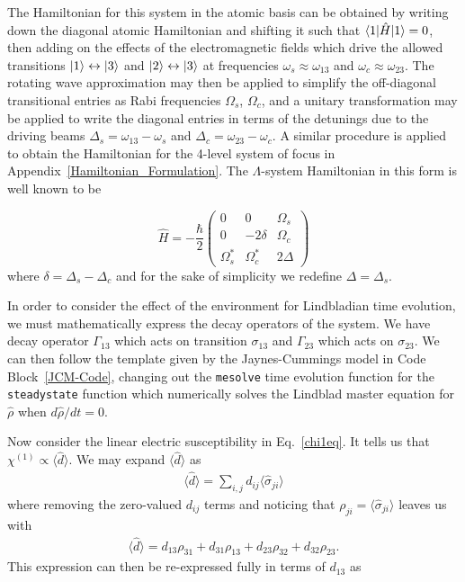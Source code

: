 \documentclass[aps,pra,showpacs,amsmath,amssymb,nofootinbib,longbibliography,superscriptaddress
]{revtex4-1}
\DeclarePairedDelimiter\bra{\langle}{\rvert}
\DeclarePairedDelimiter\ket{\lvert}{\rangle}
\theoremstyle{definition}
\theoremstyle{remark}
\newcommand{\0}{\hat{0}}
\newcommand{\expect}[1]{\bigl\langle #1 \bigr\rangle}
\begin{document}
The Hamiltonian for this system in the atomic basis can be obtained by writing down the diagonal atomic Hamiltonian and shifting it such that $\bra{1} \hat{H} \ket{1} = 0$, then adding on the effects of the electromagnetic fields which drive the allowed transitions $\ket{1} \leftrightarrow \ket{3}$ and $\ket{2} \leftrightarrow \ket{3}$ at frequencies $\omega_s \approx \omega_{13}$ and $\omega_c \approx \omega_{23}$. The rotating wave approximation may then be applied to simplify the off-diagonal transitional entries as Rabi frequencies $\Omega_s$, $\Omega_c$, and a unitary transformation may be applied to write the diagonal entries in terms of the detunings due to the driving beams $\Delta_s = \omega_{13} - \omega_s$ and $\Delta_c = \omega_{23} - \omega_c$. A similar procedure is applied to obtain the Hamiltonian for the 4-level system of focus in Appendix~\ref{Hamiltonian_Formulation}. The $\Lambda$-system Hamiltonian in this form is well known to be~\cite{Fleischhauer}

\begin{equation}
    \hat H = -\frac{\hbar}{2}\left(\begin{array}{ccc}
        0 & 0 &  \Omega_s \\
        0 & -2\delta & \Omega_c \\
        \Omega_s^* & \Omega_c^* & 2\Delta
    \end{array}\right)
\end{equation}
where $\delta = \Delta_s - \Delta_c$ and for the sake of simplicity we redefine $\Delta = \Delta_s$.

In order to consider the effect of the environment for Lindbladian time evolution, we must mathematically express the decay operators of the system. We have decay operator $\Gamma_{13}$ which acts on transition $\sigma_{13}$ and $\Gamma_{23}$ which acts on $\sigma_{23}$. We can then follow the template given by the Jaynes-Cummings model in Code Block~\ref{JCM-Code}, changing out the \lstinline|mesolve| time evolution function for the \lstinline|steadystate| function which numerically solves the Lindblad master equation for $\hat{\rho}$ when $d \hat{\rho} / dt = 0$.

Now consider the linear electric susceptibility in Eq.~\eqref{chi1eq}. It tells us that $\chi^{(1)} \propto \expect{\hat{d}}$. We may expand $\expect{\hat{d}}$ as
\begin{align}
    \expect{\hat{d}} = \sum_{i,j} d_{ij} \expect{\hat{\sigma}_{ji}}
\end{align}
where removing the zero-valued $d_{ij}$ terms and noticing that $\rho_{ji} = \expect{\hat{\sigma}_{ji}}$ leaves us with
\begin{align}
    \expect{\hat{d}} = d_{13} \rho_{31} + d_{31} \rho_{13} + d_{23} \rho_{32} + d_{32} \rho_{23}.
\end{align}
This expression can then be re-expressed fully in terms of $d_{13}$ as~\cite{Fleischhauer}
\end{document}
